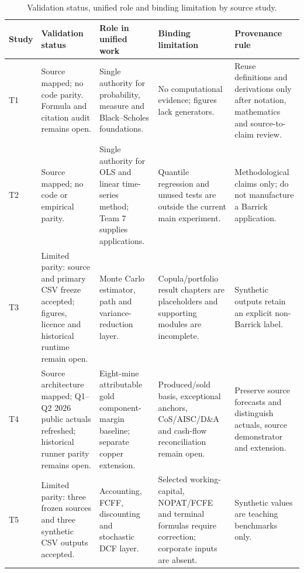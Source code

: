 \begin{table}[H]
\centering
\caption{Validation status, unified role and binding limitation by source study.}
\label{tab:team-validation-role}
\scriptsize
\setlength{\tabcolsep}{3pt}
\renewcommand{\arraystretch}{1.10}
\begin{tabularx}{\textwidth}{@{}p{0.85cm}p{2.97cm}X X X@{}}
\toprule
\textbf{Study} & \textbf{Validation status} & \textbf{Role in unified work} &
\textbf{Binding limitation} & \textbf{Provenance rule} \\
\midrule
T1 & Source mapped; no code parity. Formula and citation audit remains open. &
Single authority for probability, measure and Black--Scholes foundations. &
No computational evidence; figures lack generators. & Reuse definitions and
derivations only after notation, mathematics and source-to-claim review. \\
T2 & Source mapped; no code or empirical parity. & Single authority for OLS and
linear time-series method; Team 7 supplies applications. & Quantile regression
and unused tests are outside the current main experiment. & Methodological
claims only; do not manufacture a Barrick application. \\
T3 & Limited parity: source and primary CSV freeze accepted; figures, licence
and historical runtime remain open. & Monte Carlo estimator, path and
variance-reduction layer. & Copula/portfolio result chapters are placeholders
and supporting modules are incomplete. & Synthetic outputs retain an explicit
non-Barrick label. \\
T4 & Source architecture mapped; Q1--Q2 2026 public actuals refreshed; historical
runner parity remains open. & Eight-mine attributable gold component-margin
baseline; separate copper extension. & Produced/sold basis, exceptional
anchors, CoS/AISC/D\&A and cash-flow reconciliation remain open. & Preserve
source forecasts and distinguish actuals, source demonstrator and extension. \\
T5 & Limited parity: three frozen sources and three synthetic CSV outputs
accepted. & Accounting, FCFF, discounting and stochastic DCF layer. & Selected
working-capital, NOPAT/FCFE and terminal formulas require correction; corporate
inputs are absent. & Synthetic values are teaching benchmarks only. \\

\end{tabularx}
\end{table}
